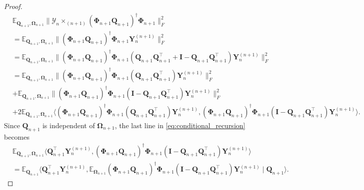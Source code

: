 \begin{lem}
\begin{proof}
\begin{equation}
\label{eq:conditional_recursion}
\begin{aligned}
&\mathbb{E}_{\mathbf{Q}_{n+1}, \mathbf{\Omega}_{n+1}}  \|\mathscr{Y}_n\times_{(n+1)} (\mathbf{\Phi}_{n+1}\mathbf{Q}_{n+1})^\dag \mathbf{\Phi}_{n+1}\|_F^2\\
& = \mathbb{E}_{\mathbf{Q}_{n+1}, \mathbf{\Omega}_{n+1}} \|(\mathbf{\Phi}_{n+1}\mathbf{Q}_{n+1})^\dag \mathbf{\Phi}_{n+1} \mathbf{Y}_n^{(n+1)}\|_F^2\\
& = \mathbb{E}_{\mathbf{Q}_{n+1}, \mathbf{\Omega}_{n+1}} \|(\mathbf{\Phi}_{n+1}\mathbf{Q}_{n+1})^\dag \mathbf{\Phi}_{n+1}(\mathbf{Q}_{n+1}\mathbf{Q}_{n+1}^\top +\mathbf{I}-\mathbf{Q}_{n+1}\mathbf{Q}_{n+1}^\top ) \mathbf{Y}_n^{(n+1)}\|_F^2\\
& = \mathbb{E}_{\mathbf{Q}_{n+1}, \mathbf{\Omega}_{n+1}} \|(\mathbf{\Phi}_{n+1}\mathbf{Q}_{n+1})^\dag \mathbf{\Phi}_{n+1}(\mathbf{Q}_{n+1}\mathbf{Q}_{n+1}^\top)\mathbf{Y}_n^{(n+1)}\|_F^2\\
&+\mathbb{E}_{\mathbf{Q}_{n+1}, \mathbf{\Omega}_{n+1}} \|(\mathbf{\Phi}_{n+1}\mathbf{Q}_{n+1})^\dag \mathbf{\Phi}_{n+1}(\mathbf{I}-\mathbf{Q}_{n+1}\mathbf{Q}_{n+1}^\top)\mathbf{Y}_n^{(n+1)}\|_F^2\\
&+2\mathbb{E}_{\mathbf{Q}_{n+1}, \mathbf{\Omega}_{n+1}}  \langle(\mathbf{\Phi}_{n+1}\mathbf{Q}_{n+1})^\dag \mathbf{\Phi}_{n+1}(\mathbf{Q}_{n+1}\mathbf{Q}_{n+1}^\top)\mathbf{Y}_n^{(n+1)},  (\mathbf{\Phi}_{n+1}\mathbf{Q}_{n+1})^\dag \mathbf{\Phi}_{n+1}(\mathbf{I}-\mathbf{Q}_{n+1}\mathbf{Q}_{n+1}^\top)\mathbf{Y}_n^{(n+1)}\rangle. 
\end{aligned}
\end{equation}
Since $\mathbf{Q}_{n+1}$ is independent of $\mathbf{\Omega}_{n+1}$, the last line in \ref{eq:conditional_recursion} becomes 
\begin{equation}
\begin{aligned}
&\mathbb{E}_{\mathbf{Q}_{n+1}, \mathbf{\Omega}_{n+1}}  \langle\mathbf{Q}_{n+1}^\top\mathbf{Y}_n^{(n+1)},  (\mathbf{\Phi}_{n+1}\mathbf{Q}_{n+1})^\dag \mathbf{\Phi}_{n+1}(\mathbf{I}-\mathbf{Q}_{n+1}\mathbf{Q}_{n+1}^\top)\mathbf{Y}_n^{(n+1)}\rangle\\
&= \mathbb{E}_{\mathbf{Q}_{n+1}} \langle\mathbf{Q}_{n+1}^\top\mathbf{Y}_n^{(n+1)}, \mathbb{E}_{\mathbf{\Omega}_{n+1}}  (\mathbf{\Phi}_{n+1}\mathbf{Q}_{n+1})^\dag \mathbf{\Phi}_{n+1}(\mathbf{I}-\mathbf{Q}_{n+1}\mathbf{Q}_{n+1}^\top)\mathbf{Y}_n^{(n+1)} \mid \mathbf{Q}_{n+1}\rangle. 
\end{aligned}
\end{equation}




\end{proof}
\end{lem}

